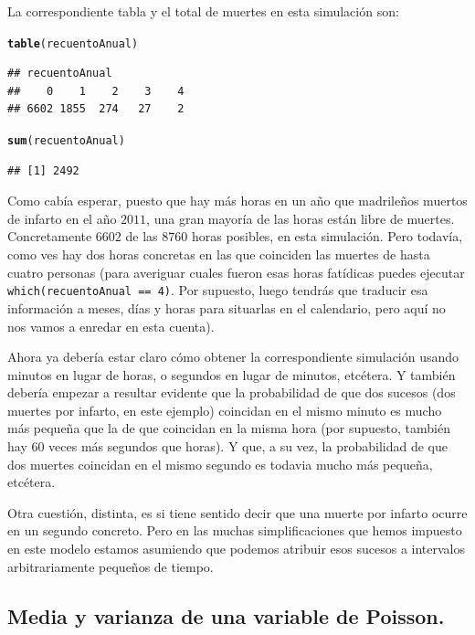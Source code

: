 \documentclass[10pt,a4paper]{article}\usepackage[]{graphicx}\usepackage[]{color}
\makeatletter
\newcommand{\hlstd}[1]{\textcolor[rgb]{0.345,0.345,0.345}{#1}}%
\newcommand{\hlkwd}[1]{\textcolor[rgb]{0.737,0.353,0.396}{\textbf{#1}}}%
\newenvironment{kframe}{%
 \def\at@end@of@kframe{}%
 \ifinner\ifhmode%
  \def\at@end@of@kframe{\end{minipage}}%
  \begin{minipage}{\columnwidth}%
 \fi\fi%
 \def\FrameCommand##1{\hskip\@totalleftmargin \hskip-\fboxsep
 \colorbox{shadecolor}{##1}\hskip-\fboxsep
     \hskip-\linewidth \hskip-\@totalleftmargin \hskip\columnwidth}%
 \MakeFramed {\advance\hsize-\width
   \@totalleftmargin\z@ \linewidth\hsize
   \@setminipage}}%
 {\par\unskip\endMakeFramed%
 \at@end@of@kframe}
\newenvironment{knitrout}{}{} %
\makeatother
\begin{document}
La correspondiente tabla y el total de muertes en esta simulación son:
\begin{knitrout}
\color{fgcolor}\begin{kframe}
\begin{alltt}
\hlkwd{table}\hlstd{(recuentoAnual)}
\end{alltt}
\begin{verbatim}
## recuentoAnual
##    0    1    2    3    4 
## 6602 1855  274   27    2
\end{verbatim}
\begin{alltt}
\hlkwd{sum}\hlstd{(recuentoAnual)}
\end{alltt}
\begin{verbatim}
## [1] 2492
\end{verbatim}
\end{kframe}
\end{knitrout}
Como cabía esperar, puesto que hay más horas en un año que madrileños muertos de infarto en el año $2011$, una gran mayoría de las horas están libre de muertes. Concretamente $6602$ de las $8760$ horas posibles, en esta simulación. Pero todavía, como ves hay dos horas concretas en las que coinciden las muertes de hasta cuatro personas (para averiguar cuales fueron esas horas fatídicas puedes ejecutar {\tt which(recuentoAnual == 4)}. Por supuesto, luego tendrás que traducir esa información a meses, días y horas para situarlas en el calendario, pero aquí no nos vamos a enredar en esta cuenta).

Ahora ya debería estar claro cómo obtener la correspondiente simulación usando minutos en lugar de horas, o segundos en lugar de minutos, etcétera. Y también debería empezar a resultar evidente que la probabilidad de que dos sucesos (dos muertes por infarto, en este ejemplo) coincidan en el mismo minuto es mucho más pequeña que la de que coincidan en la misma hora (por supuesto, también  hay $60$ veces más segundos que horas).  Y que, a su vez, la probabilidad de que dos muertes coincidan en el mismo segundo es todavia mucho más pequeña, etcétera.

Otra cuestión, distinta, es si tiene sentido decir que una muerte por infarto ocurre en un segundo concreto. Pero en las muchas simplificaciones que hemos impuesto en este modelo estamos asumiendo que podemos atribuir esos sucesos a intervalos arbitrariamente pequeños de tiempo.


\subsection{Media y varianza de una variable de Poisson.}
\end{document}
